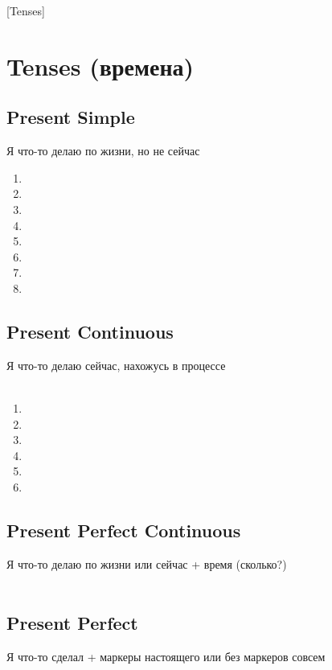[Tenses]

\section{Tenses (времена)}
\subsection{Present Simple}
\p
Я что-то делаю по жизни, но не сейчас
\begin{enumerate}
    \item {}
    \item {}
    \item {}
    \item {}
    \item {}
    \item {}
    \item {}
    \item {}
\end{enumerate}

\subsection{Present Continuous}
\p
Я что-то делаю сейчас, нахожусь в процессе\\
\\
\begin{enumerate}
    \item {}
    \item {}
    \item {}
    \item {}
    \item {}
    \item {}
\end{enumerate}
\subsection{Present Perfect Continuous}
\p
Я что-то делаю по жизни или сейчас + время (сколько?)\\
\\
\subsection{Present Perfect}
\p
Я что-то сделал + маркеры настоящего или без маркеров совсем\\
 
